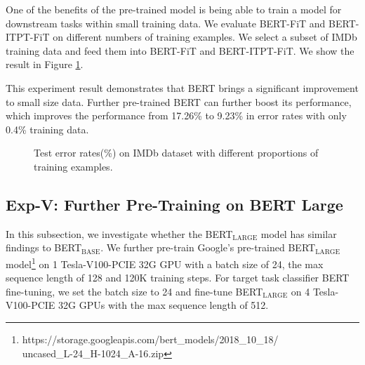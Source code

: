\documentclass[11pt,a4paper]{article}
\theoremstyle{definition}
\begin{document}
\begin{CJK*}{UTF8}{gbsn}
One of the benefits of the pre-trained model is being able to train a model for downstream tasks within small training data. We evaluate BERT-FiT and BERT-ITPT-FiT on different numbers of training examples. We select a subset of IMDb training data and feed them into BERT-FiT and BERT-ITPT-FiT. We show the result in Figure \ref{fig:few-show}.

This experiment result demonstrates that BERT brings a significant improvement to small size data. Further pre-trained BERT can further boost its performance, which improves the performance from 17.26\% to 9.23\% in error rates with only 0.4\% training data.




\begin{figure}[h!]
    \centering
    \pgfplotsset{width=0.4\textwidth}
  \caption{Test error rates(\%) on IMDb dataset with different proportions of training examples.}\label{fig:few-show}
  \end{figure}
  
\subsection{Exp-V: Further Pre-Training on BERT Large}
In this subsection, we investigate whether the  BERT$_\mathrm{LARGE}$ model has similar findings to  BERT$_\mathrm{BASE}$. We further pre-train Google's pre-trained BERT$_\mathrm{LARGE}$ model\footnote{https://storage.googleapis.com/bert\_models/2018\_10\_18/\\uncased\_L-24\_H-1024\_A-16.zip} on 1 Tesla-V100-PCIE 32G GPU with a batch size of 24, the max sequence length of 128 and 120K training steps. For target task classifier BERT fine-tuning, we set the batch size to 24 and fine-tune BERT$_\mathrm{LARGE}$ on 4 Tesla-V100-PCIE 32G GPUs with the max sequence length of 512.


\end{CJK*}
\end{document}

